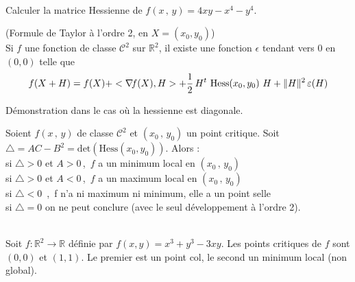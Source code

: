 \documentclass[class=report,crop=false]{standalone}
\begin{document}
{{{{{{{{{{{{{{\\
Calculer la matrice Hessienne de $f(x\,,\,y) = 4xy - x^4 - y^4$.


\begin{theoreme} (Formule de Taylor \`a l'ordre 2, en 
$X=(x_0,y_0)$)\\ Si  $f$ une fonction de classe $\mathcal{C}^2$ sur $\mathbb R^2$, il existe une fonction $\epsilon$ tendant vers 0 en $(0,0)$ telle que
$$f(X + H) = f(X) + <\nabla\hspace{-0.6mm} f(X) , H> + \displaystyle \frac{1}{2} \, 
H^t\ \mathrm{Hess}(x_0,y_0)\ H + \|H\|^2\, \varepsilon (H)$$
\end{theoreme}

Démonstration dans le cas o\`u la hessienne est diagonale.




\begin{theoreme}
Soient $f(x\,,\,y)$ de classe $\mathcal{C}^2$ et $(x_{0}\,,\,y_{0})$ un point critique.
Soit $\triangle = AC - B^2=\mathrm{det}(\mathrm{Hess}(x_0,y_0))$.
Alors :\\
si $\triangle > 0$ et $A > 0$\,,\, $f$ a un minimum local en $(x_{0}\,,\,y_{0})$\\
si $\triangle > 0$ et $A < 0$\,,\, $f$ a un maximum local en $(x_{0}\,,\,y_{0})$\\
si $\triangle < 0$ \,,\, f n'a ni maximum ni minimum, elle a un point selle\\
si $\triangle = 0$ on ne peut conclure (avec le seul développement \`a l'ordre 2).
\end{theoreme}

\\
Soit $f:\mathbb R^2 \to \mathbb R$ définie par $f(x,y)=x^3+y^3-3xy$. Les points critiques de $f$ sont $(0,0)$ et $(1,1)$. Le premier est un point col, le second un minimum local (non global).

}}}}}}}}}}}}}}
\end{document}
